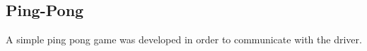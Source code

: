 \subsection{Ping-Pong}
A simple ping pong game was developed in order to communicate with the driver. 


